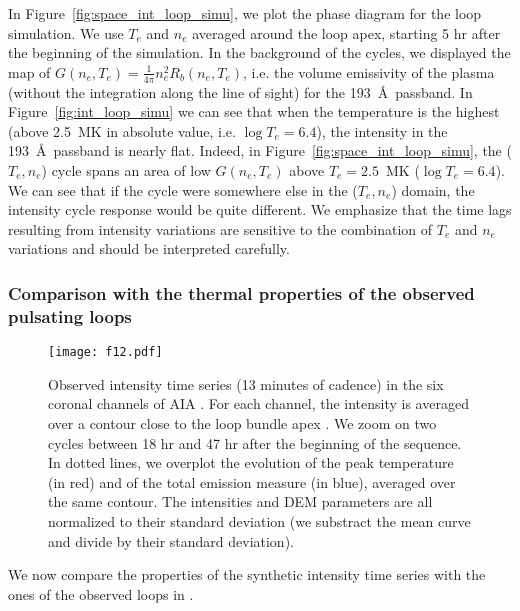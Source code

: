\documentclass[preprint2]{aastex6}
\begin{document}
In Figure~\ref{fig:space_int_loop_simu}, we plot the phase diagram for the loop simulation. We use $T_e$ and $n_e$ averaged around the loop apex, starting 5 hr after the beginning of the simulation. In the background of the cycles, we displayed the map of $G(n_e,T_e)=\frac{1}{4\pi} n_e^2 R_b(n_e,T_e)$, i.e. the volume emissivity of the plasma (without the integration along the line of sight) for the 193~\AA~passband. In Figure~\ref{fig:int_loop_simu} we can see that when the temperature is the highest (above 2.5~MK in absolute value, i.e. $\log T_e = 6.4$), the intensity in the 193~\AA~passband is nearly flat. Indeed, in Figure~\ref{fig:space_int_loop_simu}, the ($T_e,n_e$) cycle spans an area of low $G(n_e,T_e)$ above $T_e=2.5$~MK ($\log T_e = 6.4$). We can see that if the cycle were somewhere else in the ($T_e,n_e$) domain, the intensity cycle response would be quite different. We emphasize that the time lags resulting from intensity variations are sensitive to the combination of $T_e$ and $n_e$ variations and should be interpreted carefully.

	\subsubsection{Comparison with the thermal properties of the observed pulsating loops}
	

	
	\begin{figure*}  
		\centering
                \texttt{[image: f12.pdf]}
                 \caption{Observed intensity time series (13 minutes of cadence) in the six coronal channels of AIA \citep[adapted from Figure 2 of ][]{froment2015}. For each channel, the intensity is averaged over a contour close to the loop bundle apex \citep[see Figure 1 of][]{froment2015}. We zoom on two cycles between 18 hr and 47 hr after the beginning of the sequence. In dotted lines, we overplot the evolution of the peak temperature (in red) and of the total emission measure (in blue), averaged over the same contour. The intensities and DEM parameters are all normalized to their standard deviation (we substract the mean curve and divide by their standard deviation).}
                 \label{fig:int_loop_obs}
	\end{figure*}
		
	
We now compare the properties of the synthetic intensity time series with the ones of the observed loops in \citet{froment2015}.
\end{document}
